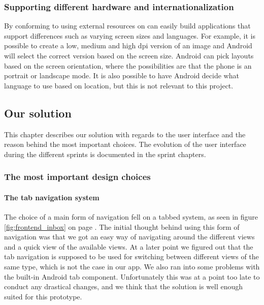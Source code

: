 \newpage 

\subsubsection{Supporting different hardware and internationalization}
By conforming to using external resources on can easily build applications that support differences such as varying screen sizes and languages. For example, it is possible to create a low, medium and high \gls{dpi} version of an image and Android will select the correct version based on the screen size. Android can pick layouts based on the screen orientation, where the possibilities are that the phone is an portrait or landscape mode. It is also possible to have Android decide what language to use based on location, but this is not relevant to this project. 

\subsection{Our solution}

This chapter describes our solution with regards to the user interface and the reason behind the most important choices. The evolution of the user interface during the different sprints is documented in the sprint chapters.

\subsubsection{The most important design choices}

\paragraph{The tab navigation system}\hfill
\newline
The choice of a main form of navigation fell on a tabbed system, as seen in figure \ref{fig:frontend_inbox} on page \pageref{fig:frontend_inbox}. The initial thought behind using this form of navigation was that we got an easy way of navigating around the different views and a quick view of the available views.
At a later point we figured out that the tab navigation is supposed to be used for switching between different views of the same type, which is not the case in our app. We also ran into some problems with the built-in Android tab component. Unfortunately this was at a point too late to conduct any drastical changes, and we think that the solution is well enough suited for this prototype.

